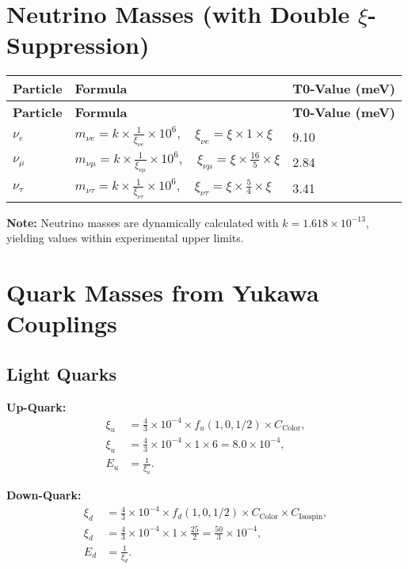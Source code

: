 \documentclass[12pt,a4paper]{article}
\begin{document}
	\section{Neutrino Masses (with Double $\xi$-Suppression)}
	\begin{longtable}{|p{3cm}|p{5cm}|p{3cm}|}
		\hline
		\textbf{Particle} & \textbf{Formula} & \textbf{T0-Value (meV)} \\
		\hline
		\endfirsthead
		\hline
		\textbf{Particle} & \textbf{Formula} & \textbf{T0-Value (meV)} \\
		\hline
		\endhead
		$\nu_e$ & $m_{\nu e} = k \times \frac{1}{\xi_{\nu e}} \times 10^6, \quad \xi_{\nu e} = \xi \times 1 \times \xi$ & 9.10 \\
		\hline
		$\nu_{\mu}$ & $m_{\nu \mu} = k \times \frac{1}{\xi_{\nu \mu}} \times 10^6, \quad \xi_{\nu \mu} = \xi \times \frac{16}{5} \times \xi$ & 2.84 \\
		\hline
		$\nu_{\tau}$ & $m_{\nu \tau} = k \times \frac{1}{\xi_{\nu \tau}} \times 10^6, \quad \xi_{\nu \tau} = \xi \times \frac{5}{4} \times \xi$ & 3.41 \\
		\hline
	\end{longtable}
	
	\textbf{Note:} Neutrino masses are dynamically calculated with $k = 1.618 \times 10^{-13}$, yielding values within experimental upper limits.
	
	\section{Quark Masses from Yukawa Couplings}
	\subsection{Light Quarks}
	
	\textbf{Up-Quark:}
	\begin{align}
		\xi_u &= \frac{4}{3} \times 10^{-4} \times f_u(1,0,1/2) \times C_{\text{Color}}, \\
		\xi_u &= \frac{4}{3} \times 10^{-4} \times 1 \times 6 = 8.0 \times 10^{-4}, \\
		E_u &= \frac{1}{\xi_u}.
	\end{align}
	
	\textbf{Down-Quark:}
	\begin{align}
		\xi_d &= \frac{4}{3} \times 10^{-4} \times f_d(1,0,1/2) \times C_{\text{Color}} \times C_{\text{Isospin}}, \\
		\xi_d &= \frac{4}{3} \times 10^{-4} \times 1 \times \frac{25}{2} = \frac{50}{3} \times 10^{-4}, \\
		E_d &= \frac{1}{\xi_d}.
	\end{align}
	
\end{document}
